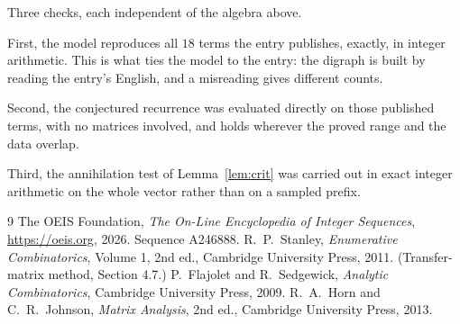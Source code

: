 \documentclass[11pt,a4paper]{article}
\theoremstyle{plain}
\theoremstyle{definition}
\begin{document}
Three checks, each independent of the algebra above.

First, the model reproduces all $18$ terms the entry publishes, exactly, in integer
arithmetic. This is what ties the model to the entry: the digraph is built by reading the
entry's English, and a misreading gives different counts.

Second, the conjectured recurrence was evaluated directly on those published terms, with no
matrices involved, and holds wherever the proved range and the data overlap.

Third, the annihilation test of Lemma~\ref{lem:crit} was carried out in exact integer
arithmetic on the whole vector rather than on a sampled prefix.

\begin{thebibliography}{9}
 The OEIS Foundation, \emph{The On-Line Encyclopedia of Integer
Sequences}, \url{https://oeis.org}, 2026. Sequence A246888.
 R.~P.~Stanley, \emph{Enumerative Combinatorics}, Volume 1, 2nd ed.,
Cambridge University Press, 2011. (Transfer-matrix method, Section 4.7.)
 P.~Flajolet and R.~Sedgewick, \emph{Analytic Combinatorics}, Cambridge
University Press, 2009.
 R.~A.~Horn and C.~R.~Johnson, \emph{Matrix Analysis}, 2nd ed., Cambridge
University Press, 2013.
\end{thebibliography}
\end{document}
